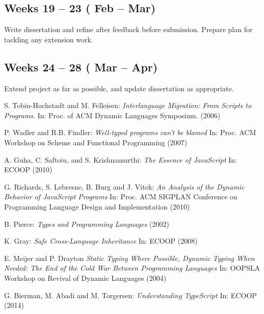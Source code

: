 \documentclass{article}
\begin{document}
		\subsection*{Weeks 19 -- 23 ( Feb --  Mar)}
		Write dissertation and refine after feedback before submission. Prepare plan for tackling any extension work.
		
		\subsection*{Weeks 24 -- 28 ( Mar --  Apr)}
		Extend project as far as possible, and update dissertation as appropriate.


	\begin{thebibliography}{9}

		S. Tobin-Hochstadt and M. Felleisen:
		\emph{Interlanguage Migration: From Scripts to Programs}.
		In: Proc. of ACM Dynamic Languages Symposium. (2006)

		 P. Wadler and R.B. Findler: 
		\emph{Well-typed programs can't be blamed}
		In: Proc. ACM Workshop on Scheme and Functional Programming (2007)

		 A. Guha, C. Saftoiu, and S. Krishnamurthi: 
		\emph{The Essence of JavaScript}
		In: ECOOP (2010)

		 G. Richards, S. Lebresne, B. Burg and J. Vitek:
		\emph{An Analysis of the Dynamic Behavior of JavaScript Programs}
		In: Proc. ACM SIGPLAN Conference on Programming Language Design and Implementation (2010)

		 B. Pierce:
		\emph{Types and Programming Languages} (2002)

		 K. Gray: 
		\emph{Safe Cross-Language Inheritance}
		In: ECOOP (2008)

		 E. Meijer and P. Drayton
		\emph{Static Typing Where Possible, Dynamic Typing When Needed: The End of the Cold War Between Programming Languages}
		In: OOPSLA Workshop on Revival of Dynamic Languages (2004)

		 G. Bierman, M. Abadi and M. Torgersen: 
		\emph{Understanding TypeScript}
		In: ECOOP (2014)

	\end{thebibliography}
\end{document}
